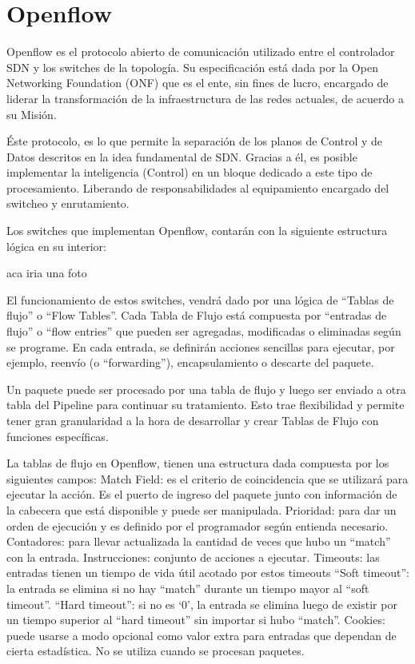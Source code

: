 \documentclass[12pt,a4paper,oneside]{book}
\begin{document}
\section{Openflow}
\label{marco_openflow}

Openflow es el protocolo abierto de comunicación utilizado entre el controlador SDN y los switches de la topología. Su especificación está dada por la Open Networking Foundation (ONF) que es el ente, sin fines de lucro, encargado de liderar la transformación de la infraestructura de las redes actuales, de acuerdo a su Misión.

Éste protocolo, es lo que permite la separación de los planos de Control y de Datos descritos en la idea fundamental de SDN. Gracias a él, es posible implementar la inteligencia (Control) en un bloque dedicado a este tipo de procesamiento. Liberando de responsabilidades al equipamiento encargado del switcheo y enrutamiento.

	Los switches que implementan Openflow, contarán con la siguiente estructura lógica en su interior:

aca iria una foto


El funcionamiento de estos switches, vendrá dado por una lógica de “Tablas de flujo” o “Flow Tables”. Cada Tabla de Flujo está compuesta por “entradas de flujo” o “flow entries” que pueden ser agregadas, modificadas o eliminadas según se programe. En cada entrada, se definirán acciones sencillas para ejecutar, por ejemplo, reenvío (o “forwarding”), encapsulamiento o descarte del paquete.

Un paquete puede ser procesado por una tabla de flujo y luego ser enviado a otra tabla del Pipeline para continuar su tratamiento. Esto trae flexibilidad y permite tener gran granularidad a la hora de desarrollar y crear Tablas de Flujo con funciones específicas.

La tablas de flujo en Openflow, tienen una estructura dada compuesta por los siguientes campos:
Match Field: es el criterio de coincidencia que se utilizará para ejecutar la acción. Es el puerto de ingreso del paquete junto con información de la cabecera que está disponible y puede ser manipulada.
Prioridad: para dar un orden de ejecución y es definido por el programador según entienda necesario.
Contadores: para llevar actualizada la cantidad de veces que hubo un “match” con la entrada.
Instrucciones: conjunto de acciones a ejecutar. 
Timeouts: las entradas tienen un tiempo de vida útil acotado por estos timeouts
“Soft timeout”: la entrada se elimina si no hay “match” durante un tiempo mayor al “soft timeout”.
“Hard timeout”: si no es ‘0’, la entrada se elimina luego de existir por un tiempo superior al “hard timeout” sin importar si hubo “match”.
Cookies: puede usarse a modo opcional como valor extra para entradas que dependan de cierta estadística. No se utiliza cuando se procesan paquetes.
	
\end{document}

